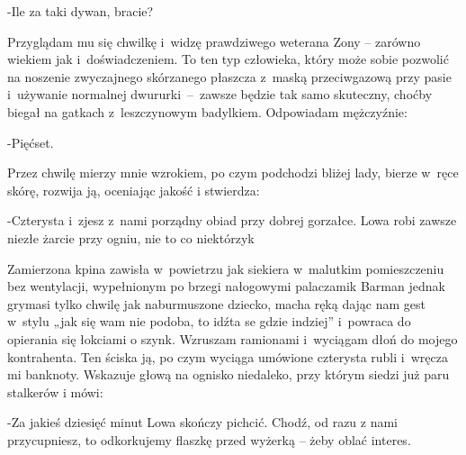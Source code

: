 \documentclass[../MAIN.tex]{subfiles}
\begin{document}
-Ile za taki dywan, bracie?

Przyglądam mu się chwilkę i~widzę prawdziwego weterana Zony –
zarówno wiekiem jak i~doświadczeniem. To ten typ człowieka,
który może sobie pozwolić na noszenie zwyczajnego skórzanego
płaszcza z~maską przeciwgazową przy pasie i~używanie normalnej
dwururki~--~zawsze będzie tak samo skuteczny, choćby biegał na
gatkach z~leszczynowym badylkiem. Odpowiadam mężczyźnie:

-Pięćset.

Przez chwilę mierzy mnie wzrokiem, po czym podchodzi bliżej
lady, bierze w~ręce skórę, rozwija ją, oceniając jakość i
stwierdza:

-Czterysta i~zjesz z~nami porządny obiad przy dobrej gorzałce.
Lowa robi zawsze niezłe żarcie przy ogniu, nie to co
niektórzy\3k

Zamierzona kpina zawisła w~powietrzu jak siekiera w~malutkim
pomieszczeniu bez wentylacji, wypełnionym po brzegi nałogowymi
palaczami\3k Barman jednak grymasi tylko chwilę jak
naburmuszone dziecko, macha ręką dając nam gest w~stylu „jak
się wam nie podoba, to idźta se gdzie indziej” i~powraca do
opierania się łokciami o szynk. Wzruszam ramionami i~wyciągam
dłoń do mojego kontrahenta. Ten ściska ją, po czym wyciąga
umówione czterysta rubli i~wręcza mi banknoty. Wskazuje głową
na ognisko niedaleko, przy którym siedzi już paru stalkerów i
mówi:

-Za jakieś dziesięć minut Lowa skończy pichcić. Chodź, od razu
z nami przycupniesz, to odkorkujemy flaszkę przed wyżerką –
żeby oblać interes.
\end{document}
